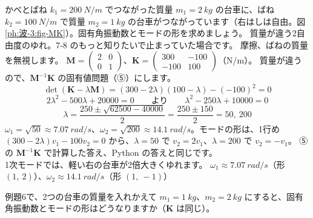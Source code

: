\label{ph:波-3:ex6}
\begin{phreidai}
かべとばね $k_1=\qty{200}{N/m}$ でつながった質量 $m_1=\qty{2}{kg}$ の台車に、ばね $k_2=\qty{100}{N/m}$ で質量 $m_2=\qty{1}{kg}$ の台車がつながっています（右はしは自由。図\ref{ph:波-3:fig-MK}）。固有角振動数とモードの形を求めましょう。
\phbamen
質量が違う2自由度のゆれ。7-8 のもっと知りたいで止まっていた場合です。
\phmushi
摩擦、ばねの質量を無視します。
\phzu
$\mathbf M=\begin{pmatrix}2&0\\0&1\end{pmatrix}$、$\mathbf K=\begin{pmatrix}300&-100\\-100&100\end{pmatrix}$（N/m）。
\phriyu
質量が違うので、$\mathbf M^{-1}\mathbf K$ の固有値問題（⑤）にします。
\phtateru
\[\det(\mathbf K-\lambda\mathbf M)=(300-2\lambda)(100-\lambda)-(-100)^2=0\]
\phtoku
\[2\lambda^2-500\lambda+\num{20000}=0\qquad\text{より}\qquad\lambda^2-250\lambda+\num{10000}=0\]
\[\lambda=\frac{250\pm\sqrt{\num{62500}-\num{40000}}}{2}=\frac{250\pm150}{2}=50,\ 200\]
$\omega_1=\sqrt{50}\approx\qty{7.07}{rad/s}$、$\omega_2=\sqrt{200}\approx\qty{14.1}{rad/s}$。モードの形は、1行め $(300-2\lambda)v_1-100v_2=0$ から、$\lambda=50$ で $v_2=2v_1$、$\lambda=200$ で $v_2=-v_1$。
\phtashikame
⑤の $\mathbf M^{-1}\mathbf K$ で計算した答え、Python の答えと同じです。\\
1次モードでは、軽い右の台車が2倍大きくゆれます。
\kotae $\omega_1\approx\qty{7.07}{rad/s}$（形 $(1,\ 2)$）、$\omega_2\approx\qty{14.1}{rad/s}$（形 $(1,\ -1)$）
\end{phreidai}
\begin{jibun}
例題6で、2つの台車の質量を入れかえて $m_1=\qty{1}{kg}$、$m_2=\qty{2}{kg}$ にすると、固有角振動数とモードの形はどうなりますか（$\mathbf K$ は同じ）。
\end{jibun}

